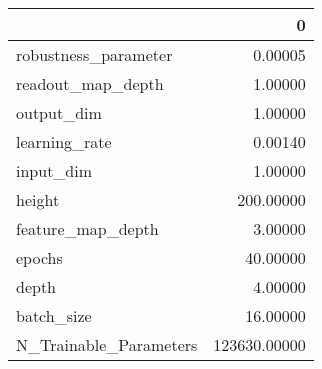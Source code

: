 \begin{tabular}{lr}
\toprule
{} &             0 \\
\midrule
robustness\_parameter   &       0.00005 \\
readout\_map\_depth      &       1.00000 \\
output\_dim             &       1.00000 \\
learning\_rate          &       0.00140 \\
input\_dim              &       1.00000 \\
height                 &     200.00000 \\
feature\_map\_depth      &       3.00000 \\
epochs                 &      40.00000 \\
depth                  &       4.00000 \\
batch\_size             &      16.00000 \\
N\_Trainable\_Parameters &  123630.00000 \\
\bottomrule
\end{tabular}
